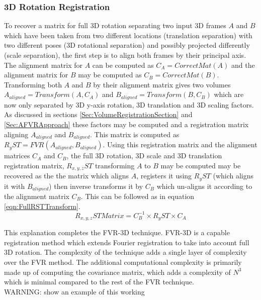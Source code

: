 \subsubsection{3D Rotation Registration}

To recover a matrix for full 3D rotation separating two input 3D frames $A$ and $B$ which have been taken from two different locations (translation separation) with two different poses (3D rotational separation) and possibly projected differently (scale separation), the first step is to align both frames by their principal axis. The alignment matrix for $A$ can be computed as $C_A = CorrectMat(A)$ and the alignment matrix for $B$ may be computed as $C_B = CorrectMat(B)$. Transforming both $A$ and $B$ by their alignment matrix gives two volumes $A_{aligned} = Transform(A, C_A)$ and $B_{aligned} = Transform(B, C_B)$ which are now only separated by 3D y-axis rotation, 3D translation and 3D scaling factors. As discussed in sections \ref{Sec:VolumeRegistrationSection} and \ref{Sec:AFVRApproach} these factors may be computed and a registration matrix aligning $A_{aligned}$ and $B_{aligned}$. This matrix is computed as $R_{y}ST = FVR(A_{aligned},B_{aligned})$. Using this registration matrix and the alignment matrices $C_{A}$ and $C_{B}$, the full 3D rotation, 3D scale and 3D translation registration matrix, $R_{x,y,z}ST$ transforming $A$ to $B$ may be computed may be recovered as the the matrix which aligns $A$, registers it using $R_{y}ST$ (which aligns it with $B_{aligned}$) then inverse transforms it by $C_{B}$ which un-aligns it according to the alignment matrix $C_B$. This can be followed as in equation \ref{eqn:FullRSTTransform}. \\ 

\begin{equation} \label{eqn:FullRSTTransform}
R_{x,y,z}ST Matrix = C_{B}^{-1} \times R_{y}ST \times C_A
\end{equation}

This explanation completes the FVR-3D technique. FVR-3D is a capable registration method which extends Fourier registration to take into account full 3D rotation. The complexity of the technique adds a single layer of complexity over the FVR method. The additional computational complexity is primarily made up of computing the covariance matrix, which adds a complexity of $N^3$ which is minimal compared to the rest of the FVR technique. \\


WARNING: show an example of this working

